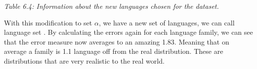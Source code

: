 \begin{center}

\vspace{0.1cm}
{\it \footnotesize Table 6.4: Information about the new languages chosen for the dataset.}
\end{center}

\noindent With this modification to set $\alpha$, we have a new set of languages, we can call language set . By calculating the errors again for each language family, we can see that the error measure now averages to an amazing 1.83. Meaning that on average a family is 1.1 language off from the real distribution. These are distributions that are very realistic to the real world. 

